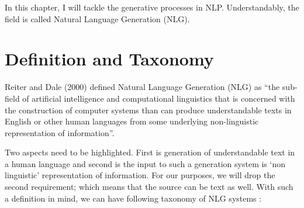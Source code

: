 \documentclass[]{krantz}
\begin{document}
In this chapter, I will tackle the generative processes in NLP. Understandably, the field is called Natural Language Generation (NLG).

\hypertarget{definition-and-taxonomy}{%
\section{Definition and Taxonomy}\label{definition-and-taxonomy}}

Reiter and Dale (2000) defined Natural Language Generation (NLG) as ``the sub-field of artificial intelligence and computational linguistics that is concerned with the construction of computer systems than can produce understandable texts in English or other human languages from some underlying non-linguistic representation of information''.

Two aspects need to be highlighted. First is generation of understandable text in a human language and second is the input to such a generation system is `non linguistic' representation of information. For our purposes, we will drop the second requirement; which means that the source can be text as well. With such a definition in mind, we can have following taxonomy of NLG systems :
\end{document}
